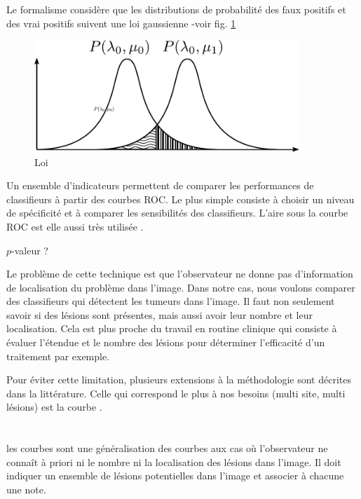 Le formalisme \ROC considère que les distributions de probabilité des faux positifs et des vrai positifs suivent une loi gaussienne -voir fig. \ref{fig:loiROC}

\begin{figure}[h]
	
	\label{fig:loiROC}
	\begin{center}
	\includegraphics[width=10cm]{images/loiROC}
	\end{center}
	\caption{Loi \ROC}
\end{figure}

Un ensemble d'indicateurs permettent de comparer les performances de classifieurs à partir des courbes ROC. Le plus simple consiste à choisir un niveau de spécificité et à comparer les sensibilités des classifieurs. L'aire sous la courbe ROC est elle aussi très utilisée \cite{nie2006integrating}. 

$p$-valeur ?

Le problème de cette technique est que l'observateur ne donne pas d'information de localisation du problème dans l'image. Dans notre cas, nous voulons comparer des classifieurs qui détectent les tumeurs dans l'image. Il faut non seulement savoir si des lésions sont présentes, mais aussi avoir leur nombre et leur localisation. Cela est plus proche du travail en routine clinique qui consiste à évaluer l'étendue et le nombre des lésions pour déterminer l'efficacité d'un traitement par exemple. 

Pour éviter cette limitation, plusieurs extensions à la méthodologie \ROC sont décrites dans la littérature. Celle qui correspond le plus à nos besoins (multi site, multi lésions) est la courbe \FROC.

	\section{\FROC}	

les courbes \FROC sont une généralisation des courbes \ROC aux cas où l'observateur ne connaît à priori ni le nombre ni la localisation des lésions dans l'image. Il doit indiquer un ensemble de lésions potentielles dans l'image et associer à chacune une note.

